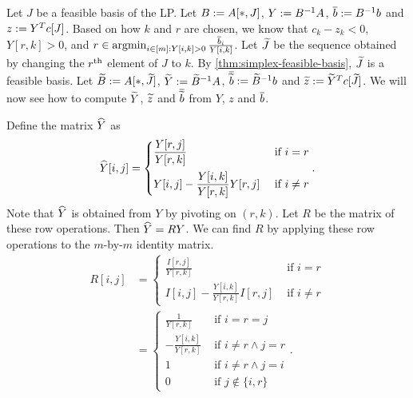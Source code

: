 Let $J$ be a feasible basis of the LP.
Let $B := A[*,J]$, $Y := B^{-1}A$, $\overline{b} := B^{-1}b$ and $z := Y^Tc[J]$.
Based on how $k$ and $r$ are chosen, we know that $c_k - z_k < 0$,
$Y[r,k] > 0$, and $r \in \operatorname*{argmin}_{i \in [m]: Y[i,k] > 0} \frac{\overline{b}_i}{Y[i,k]}$.
Let $\widetilde{J}$ be the sequence obtained by changing the $r^{\textrm{th}}$ element of $J$ to $k$.
By \cref{thm:simplex-feasible-basis}, $\widetilde{J}$ is a feasible basis.
Let $\widetilde{B} := A[*,\widetilde{J}]$, $\widetilde{Y} := \widetilde{B}^{-1}A$, $\overline{\widetilde{b}} := \widetilde{B}^{-1}b$
and $\widetilde{z} := \widetilde{Y}^Tc[\widetilde{J}]$.
We will now see how to compute $\widetilde{Y}$, $\widetilde{z}$ and $\overline{\widetilde{b}}$
from $Y$, $z$ and $\overline{b}$.

Define the matrix $\widehat{Y}$ as
\[ \widehat{Y}[i,j] = \begin{cases}
\displaystyle \frac{Y[r,j]}{Y[r,k]} & \textrm{ if } i = r
\\[1em] \displaystyle Y[i,j] - \frac{Y[i,k]}{Y[r,k]}Y[r,j] & \textrm{ if } i \neq r
\end{cases}. \]
Note that $\widehat{Y}$ is obtained from $Y$ by pivoting on $(r, k)$.
Let $R$ be the matrix of these row operations. Then $\widehat{Y} = RY$.
We can find $R$ by applying these row operations to the $m$-by-$m$ identity matrix.
\begin{align*}
R[i,j] &= \begin{cases}
\displaystyle \frac{I[r,j]}{Y[r,k]} & \textrm{ if } i = r
\\[1em] \displaystyle I[i,j] - \frac{Y[i,k]}{Y[r,k]}I[r,j] & \textrm{ if } i \neq r
\end{cases}
\\ &= \begin{cases}
\displaystyle \frac{1}{Y[r,k]} & \textrm{ if } i = r = j
\\[1em] \displaystyle -\frac{Y[i,k]}{Y[r,k]} & \textrm{ if } i \neq r \land j = r
\\ \displaystyle 1 & \textrm{ if } i \neq r \land j = i
\\ \displaystyle 0 & \textrm{ if } j \not\in \{i, r\}
\end{cases}.
\end{align*}

